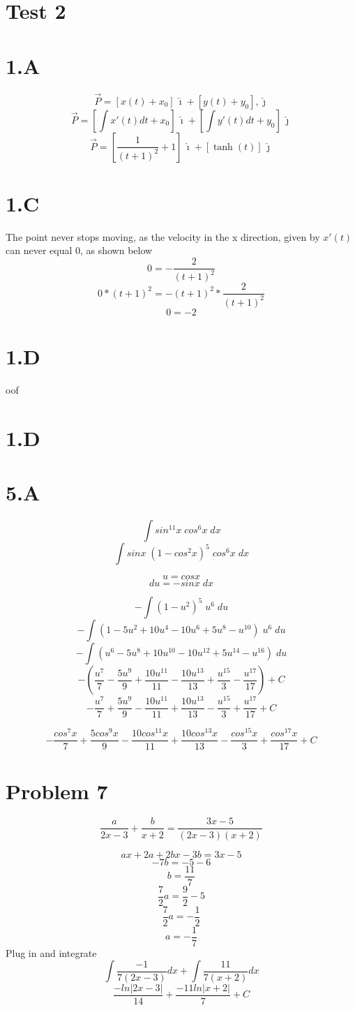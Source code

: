 \documentclass{article}
\newcommand{\ihat}{\mathbf {\hat \imath}}
\newcommand{\jhat}{\mathbf {\hat \jmath}}
\begin{document}
\section*{Test 2}
\section*{1.A}
$$ \vec{P} = [x(t)+x_0]\, \ihat + [y(t)+y_0], \jhat $$
$$ \vec{P} = [\int x'(t)dt +x_0] \, \ihat + [\int y'(t)dt +y_0] \, \jhat $$
$$ \vec{P} = [\frac{1}{(t+1)^2} +1] \, \ihat + [\tanh(t)] \, \jhat $$
\section*{1.C}
The point never stops moving, as the velocity in the x direction, given by $x'(t)$ can never equal 0, as shown below
$$0=- \frac{2}{(t+1)^2} $$
$$0*(t+1)^2 = - (t+1)^2* \frac{2}{(t+1)^2} $$
$$0 = -2 $$

\section*{1.D}
oof
\section*{1.D}




\section*{5.A}
$$\int sin^{11}x\; cos^6x\;dx$$
$$\int sinx\; (1-cos^2x)^5\; cos^6x\;dx$$

$$u=cosx$$
$$du=-sinx\;dx$$

$$-\int (1-u^2)^5\; u^6\;du$$
$$-\int (1-5u^2+10u^4-10u^6+5u^8-u^{10})\; u^6\;du$$
$$-\int (u^6-5u^8+10u^{10}-10u^{12}+5u^{14}-u^{16})\; du$$
$$-(\frac{u^7}{7}-\frac{5u^9}{9}+\frac{10u^{11}}{11}-\frac{10u^{13}}{13}+\frac{u^{15}}{3}-\frac{u^{17}}{17})+C$$
$$-\frac{u^7}{7}+\frac{5u^9}{9}-\frac{10u^{11}}{11}+\frac{10u^{13}}{13}-\frac{u^{15}}{3}+\frac{u^{17}}{17}+C$$

$$-\frac{cos^7x}{7}+\frac{5cos^9x}{9}-\frac{10cos^{11}x}{11}+\frac{10cos^{13}x}{13}-\frac{cos^{15}x}{3}+\frac{cos^{17}x}{17}+C$$
\clearpage
\section{Problem 7}
$$\frac{a}{2x-3}+\frac{b}{x+2}=\frac{3x-5}{(2x-3)(x+2)}$$

$$ax+2a+2bx-3b=3x-5$$
$$-7b=-5-6$$
$$b=\frac{11}{7}$$
$$\frac{7}{2}a=\frac{9}{2}-5$$
$$\frac{7}{2}a=-\frac{1}{2}$$
$$a=-\frac{1}{7}$$
Plug in and integrate
$$\int \frac{-1}{7(2x-3)}dx+\int \frac{11}{7(x+2)}dx$$
$$\frac{-ln|2x-3|}{14}+ \frac{-11ln|x+2|}{7}+C$$
\end{document}
